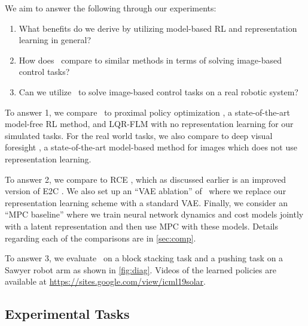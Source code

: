 We aim to answer the following through our experiments:
\vspace{-.5em}
\begin{enumerate}
    \itemsep0em
    \item What benefits do we derive by utilizing model-based RL and representation learning in general?
    \item How does \metabbr\ compare to similar methods in terms of solving image-based control tasks?
    \item Can we utilize \metabbr\ to solve image-based control tasks on a real robotic system?
\end{enumerate}
\vspace{-.5em}
To answer 1, we compare \metabbr\ to proximal policy optimization \citep[PPO; ][]{ppo}, a state-of-the-art model-free RL method, and LQR-FLM with no representation learning for our simulated tasks. For the real world tasks, we also compare to deep visual foresight \citep[DVF; ][]{vf}, a state-of-the-art model-based method for images which does not use representation learning.

To answer 2, we compare to RCE \citep{rce}, which as discussed earlier is an improved version of E2C \citep{e2c}. We also set up an ``VAE ablation'' of \metabbr\ where we replace our representation learning scheme with a standard VAE. Finally, we consider an ``MPC baseline'' where we train neural network dynamics and cost models jointly with a latent representation and then use MPC with these models. Details regarding each of the comparisons are in \autoref{sec:comp}.

To answer 3, we evaluate \metabbr\ on a block stacking task and a pushing task on a Sawyer robot arm as shown in \autoref{fig:diag}. Videos of the learned policies are available at \mbox{\footnotesize{\url{https://sites.google.com/view/icml19solar}}.}

\subsection{Experimental Tasks}

